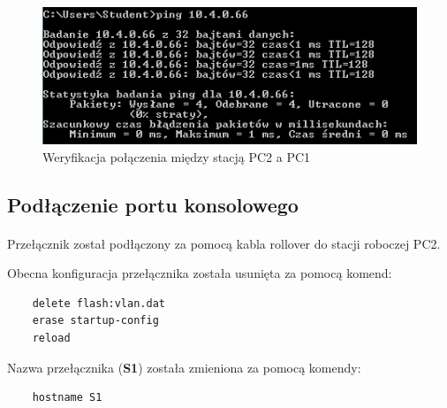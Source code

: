 \documentclass[wide,a4paper,titlepage,12pt] {article}
\begin{document}
  \begin{figure}[H]
    \begin{center}
      \includegraphics[width=\textwidth]{img/t1.PNG}
      \caption{Weryfikacja połączenia między stacją PC2 a PC1}
    \end{center}
  \end{figure}

  \subsection{Podłączenie portu konsolowego}
  \paragraph{}
  Przełącznik został podłączony za pomocą kabla rollover do stacji roboczej PC2.

  Obecna konfiguracja przełącznika została usunięta za pomocą komend:
  \begin{verbatim}
    delete flash:vlan.dat
    erase startup-config
    reload
  \end{verbatim}

  Nazwa przełącznika (\textbf{S1}) została zmieniona za pomocą komendy:
  \begin{verbatim}
    hostname S1
  \end{verbatim}
\end{document}
